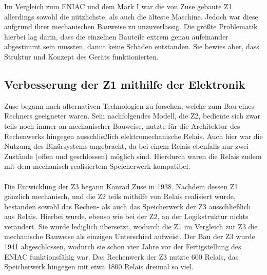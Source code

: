 Im Vergleich zum ENIAC und dem Mark I war die von Zuse gebaute Z1 allerdings sowohl die nützlichste, als auch die älteste Maschine. Jedoch war diese aufgrund ihrer mechanischen Bauweise zu unzuverlässig. Die größte Problematik hierbei lag darin, dass die einzelnen Bauteile extrem genau aufeinander abgestimmt sein mussten, damit keine Schäden entstanden. Sie bewies aber, dass Struktur und Konzept des Geräts funktionierten.
\subsection{Verbesserung der Z1 mithilfe der Elektronik}
Zuse begann nach alternativen Technologien zu forschen, welche zum Bau eines Rechners geeigneter waren. Sein nachfolgendes Modell, die Z2, bediente sich zwar teils noch immer an mechanischer Bauweise, nutzte für die Architektur des Rechenwerks hingegen ausschließlich elektromechanische Relais. Auch hier war die Nutzung des Binärsystems angebracht, da bei einem Relais ebenfalls nur zwei Zustände (offen und geschlossen) möglich sind. Hierdurch waren die Relais zudem mit dem mechanisch realisiertem Speicherwerk kompatibel.\\\\
Die Entwicklung der Z3 begann Konrad Zuse in 1938. Nachdem dessen Z1 gänzlich mechanisch, und die Z2 teils mithilfe von Relais realisiert wurde, bestanden sowohl das Rechen- als auch das Speicherwerk der Z3 ausschließlich aus Relais. Hierbei wurde, ebenso wie bei der Z2, an der Logikstruktur nichts verändert. Sie wurde lediglich übersetzt, wodurch die Z1 im Vergleich zur Z3 die mechanische Bauweise als einzigen Unterschied aufweist. Der Bau der Z3 wurde 1941 abgeschlossen, wodurch sie schon vier Jahre vor der Fertigstellung des ENIAC funktionsfähig war. Das Rechenwerk der Z3 nutzte 600 Relais, das Speicherwerk hingegen mit etwa 1800 Relais dreimal so viel.
